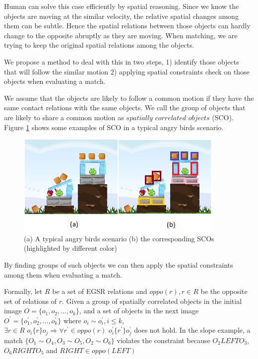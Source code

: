 \documentclass[letterpaper]{article}
\begin{document}
Human can solve this case efficiently by spatial reasoning. Since we know the objects are moving at the similar velocity, the relative spatial changes among them can be subtle. Hence the spatial relations between those objects can hardly change to the opposite abruptly as they are moving. When matching, we are trying to keep the original spatial relations among the objects. 

We propose a method to deal with this in two steps, 1) identify those objects that will follow the similar motion 2) applying spatial constraints check on those objects when evaluating a match. 


We assume that the objects are likely to follow a common motion if they have the same contact relations with the same objects. We call the group of objects that are likely to share a common motion as $spatially\,\,correlated\,\,objects$ (SCO). Figure \ref{SCOExample} shows some examples of SCO in a typical angry birds scenario. 
\begin{figure}[h!]\label{SCOExample}
\centering\includegraphics[scale=0.7]{SCOScenario.png}\caption{(a) A typical angry birds scenario (b) the corresponding SCOs (highlighted by different color)}
\end{figure}
By finding groups of such objects we can then apply the spatial constraints among them when evaluating a match. 

Formally, let $R$ be a set of EGSR relations and $oppo(r), r\in R$ be the opposite set of relations of $r$. Given a group of spatially correlated objects in the initial image $O = \{o_1, o_2, ... , o_k\}$, and a set of objects in the next image $O^\prime = \{o^{\prime}_1, o^{\prime}_2, ..., o^{\prime}_k \}$ where $o_i \sim o^{\prime}_i, i \leq k$, $\exists r\in R\,\, o_i \{r\} o_j \Rightarrow \forall r^{\prime} \in oppo(r)\,\, o^{\prime}_i \{r^{\prime}\} o^{\prime}_j $ does not hold. In the slope example, a match $\{O_1 \sim O_4, O_3 \sim O_5, O_2 \sim O_6\}$ violates the constraint because $O_2 LEFT O_3$, $O_6 RIGHT O_5$ and $RIGHT \in oppo(LEFT)$  
\end{document}

